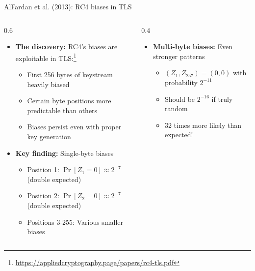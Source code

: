 \documentclass[aspectratio=169, lualatex, handout]{beamer}
\begin{document}
\begin{frame}{AlFardan et al. (2013): RC4 biases in TLS}
	\begin{columns}[c]
		\begin{column}{0.6\textwidth}
			\begin{itemize}[<+->]
				\item \textbf{The discovery:} RC4's biases are exploitable in TLS:\footnote{\url{https://appliedcryptography.page/papers/rc4-tls.pdf}}
				      \begin{itemize}[<+->]
					      \item First 256 bytes of keystream heavily biased
					      \item Certain byte positions more predictable than others
					      \item Biases persist even with proper key generation
				      \end{itemize}
				\item \textbf{Key finding:} Single-byte biases
				      \begin{itemize}[<+->]
					      \item Position 1: $\Pr[Z_1 = 0] \approx 2^{-7}$ (double expected)
					      \item Position 2: $\Pr[Z_2 = 0] \approx 2^{-7}$ (double expected)
					      \item Positions 3-255: Various smaller biases
				      \end{itemize}
			\end{itemize}
		\end{column}
		\begin{column}{0.4\textwidth}
			\begin{itemize}[<+->]
				\item \textbf{Multi-byte biases:} Even stronger patterns
				      \begin{itemize}[<+->]
					      \item $(Z_1, Z_{257}) = (0, 0)$ with probability $2^{-11}$
					      \item Should be $2^{-16}$ if truly random
					      \item 32 times more likely than expected!
				      \end{itemize}
			\end{itemize}
		\end{column}
	\end{columns}
\end{frame}
\end{document}
